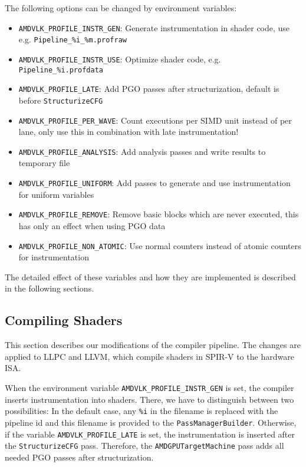 The following options can be changed by environment variables:
\begin{itemize}
	\item \texttt{AMDVLK\_PROFILE\_INSTR\_GEN}: Generate instrumentation in shader code, use e.g. \texttt{Pipeline\_\%i\_\%m.profraw}
	\item \texttt{AMDVLK\_PROFILE\_INSTR\_USE}: Optimize shader code, e.g. \texttt{Pipeline\_\%i.profdata}
	\item \texttt{AMDVLK\_PROFILE\_LATE}: Add PGO passes after structurization, default is before \texttt{StructurizeCFG}
	\item \texttt{AMDVLK\_PROFILE\_PER\_WAVE}: Count executions per SIMD unit instead of per lane, only use this in combination with late instrumentation!
	\item \texttt{AMDVLK\_PROFILE\_ANALYSIS}: Add analysis passes and write results to temporary file
	\item \texttt{AMDVLK\_PROFILE\_UNIFORM}: Add passes to generate and use instrumentation for uniform variables
	\item \texttt{AMDVLK\_PROFILE\_REMOVE}: Remove basic blocks which are never executed, this has only an effect when using PGO data
	\item \texttt{AMDVLK\_PROFILE\_NON\_ATOMIC}: Use normal counters instead of atomic counters for instrumentation
\end{itemize}

The detailed effect of these variables and how they are implemented is described in the following sections.

\subsection{Compiling Shaders}
\label{sub:compiling}
This section describes our modifications of the compiler pipeline.
The changes are applied to LLPC and LLVM, which compile shaders in SPIR-V to the hardware ISA.

When the environment variable \texttt{AMDVLK\_PROFILE\_INSTR\_GEN} is set, the compiler inserts instrumentation into shaders. There, we have to distinguish between two possibilities:
In the default case, any \texttt{\%i} in the filename is replaced with the pipeline id and this filename is provided to the \texttt{PassManagerBuilder}.
Otherwise, if the variable \texttt{AMDVLK\_PROFILE\_LATE} is set, the instrumentation is inserted after the \texttt{StructurizeCFG} pass.
Therefore, the \texttt{AMDGPUTargetMachine} pass adds all needed PGO passes after structurization.

